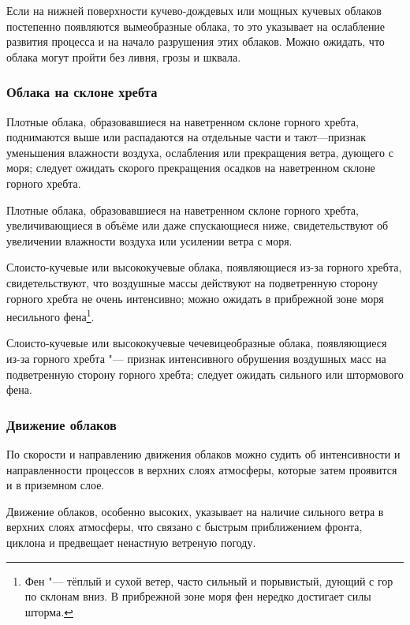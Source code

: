  Если на нижней поверхности кучево-дождевых или мощных кучевых
облаков постепенно появляются вымеобразные облака, то это указывает на
ослабление развития процесса и на начало разрушения этих
облаков. Можно ожидать, что облака могут пройти без ливня, грозы и
шквала.

\subsubsection{Облака на склоне хребта}

 Плотные облака, образовавшиеся на наветренном склоне горного
хребта, поднимаются выше или распадаются на отдельные части и
тают—признак уменьшения влажности воздуха, ослабления или прекращения
ветра, дующего с моря; следует ожидать скорого прекращения осадков на
наветренном склоне горного хребта.

 Плотные облака, образовавшиеся на наветренном склоне горного
хребта, увеличивающиеся в объёме или даже спускающиеся ниже,
свидетельствуют об увеличении влажности воздуха или усилении ветра с
моря.

 Слоисто-кучевые или высококучевые облака, появляющиеся из-за
горного хребта, свидетельствуют, что воздушные массы действуют на
подветренную сторону горного хребта не очень интенсивно; можно ожидать
в прибрежной зоне моря несильного фена\footnote{Фен "--- тёплый и
  сухой ветер, часто сильный и порывистый, дующий с гор по склонам
  вниз. В прибрежной зоне моря фен нередко достигает силы шторма.}.

 Слоисто-кучевые или высококучевые чечевицеобразные облака,
появляющиеся из-за горного хребта "--- признак интенсивного обрушения
воздушных масс на подветренную сторону горного хребта; следует ожидать
сильного или штормового фена.

\subsubsection{Движение облаков}

По скорости и направлению движения облаков можно судить об
интенсивности и направленности процессов в верхних слоях атмосферы,
которые затем проявится и в приземном слое.

 Движение облаков, особенно высоких, указывает на наличие
сильного ветра в верхних слоях атмосферы, что связано с быстрым
приближением фронта, циклона и предвещает ненастную ветреную погоду.

